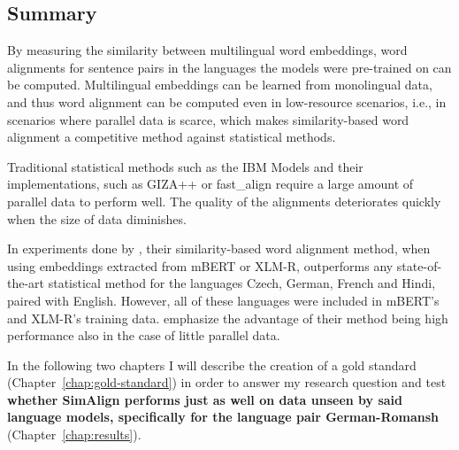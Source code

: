 \subsection{Summary}
By measuring the similarity between multilingual word embeddings, word alignments for sentence pairs in the languages the models were pre-trained on can be computed. 
Multilingual embeddings can be learned from monolingual data, and thus word alignment can be computed even in low-resource scenarios, i.e., in scenarios where parallel data is scarce, which makes similarity-based word alignment a competitive method against statistical methods. 

Traditional statistical methods such as the IBM Models \autocite{brown-etal-1993-mathematics} and their implementations, such as GIZA++ \autocite{och-ney-2003-smt} or fast\_align \autocite{dyer-etal-2013-simple} require a large amount of parallel data to perform well.
The quality of the alignments deteriorates quickly when the size of data diminishes\footnotemark. 


In experiments done by \cite{jalili-sabet-etal-2020-simalign}, their similarity-based word alignment method, when using embeddings extracted from mBERT or XLM-R, outperforms any state-of-the-art statistical method for the languages Czech, German, French and Hindi, paired with English. 
However, all of these languages were included in mBERT's and XLM-R's training data. 
\cite{jalili-sabet-etal-2020-simalign} emphasize the advantage of their method being high performance also in the case of little  parallel data.

In the following two chapters I will describe the creation of a gold standard (Chapter~\ref{chap:gold-standard}) in order to answer my research question and test \textbf{whether SimAlign performs just as well on data unseen by said language models, specifically for the language pair German-Romansh} (Chapter~\ref{chap:results}).



